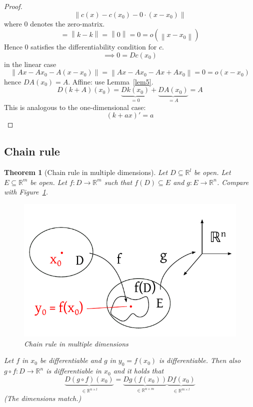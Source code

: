 \documentclass{article}
\newtheorem{theorem}{Theorem}  \numberwithin{theorem}{section}
\newcommand{\norm}[1]{\left\|#1\right\|}
\begin{document}
\begin{proof}
  \[ \norm{c(x) - c(x_0) - 0 \cdot (x - x_0)} \]
  where $0$ denotes the zero-matrix.
  \[ = \norm{k - k} = \norm{0} = 0 = o(\norm{x - x_0}) \]
  Hence $0$ satisfies the differentiability condition for $c$.
  \[ \implies 0 = Dc(x_0) \]
  in the linear case
  \[ \norm{Ax - Ax_0 - A(x - x_0)} = \norm{Ax - Ax_0 - Ax + Ax_0} = 0 = o({x - x_0}) \]
  hence $DA(x_0) = A$.
  Affine: use Lemma~\ref{lem5}.
  \[ D(k + A)(x_0) = \underbrace{Dk(x_0)}_{=0} + \underbrace{DA(x_0)}_{= A} = A \]
  This is analogous to the one-dimensional case:
  \[ (k + ax)' = a \]
\end{proof}

\subsection{Chain rule}
\begin{theorem}[Chain rule in multiple dimensions]
  Let $D \subseteq \mathbb R^l$ be open. Let $E \subseteq \mathbb R^m$ be open.
  Let $f: D \to \mathbb R^m$ such that $f(D) \subseteq E$ and $g: E \to \mathbb R^n$.
  Compare with Figure~\ref{chainrule}.

  \begin{figure}[t]
    \begin{center}
      \includegraphics{img/30_fg.pdf}
      \caption{Chain rule in multiple dimensions}
      \label{chainrule}
    \end{center}
  \end{figure}

  Let $f$ in $x_0$ be differentiable and $g$ in $y_0 = f(x_0)$ is differentiable.
  Then also $g \circ f: D \to \mathbb R^n$ is differentiable in $x_0$ and it holds that
  \[ \underbrace{D(g \circ f)(x_0)}_{\in \mathbb R^{n \times l}} = \underbrace{Dg(f(x_0))}_{\in \mathbb R^{n \times m}} \underbrace{Df(x_0)}_{\in \mathbb R^{m \times l}} \]
  (The dimensions match.)
\end{theorem}
\end{document}
